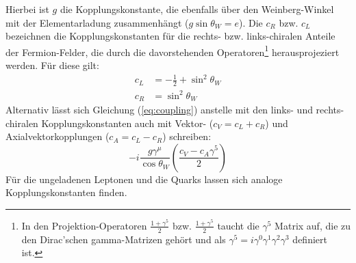 Hierbei ist $g$ die Kopplungskonstante, die ebenfalls über den Weinberg-Winkel
mit der Elementarladung zusammenhängt ($g\sin\theta_W=e$). Die $c_R$ bzw.
$c_L$ bezeichnen die Kopplungskonstanten für die rechts- bzw. links-chiralen
Anteile der Fermion-Felder, die durch die davorstehenden Operatoren\footnote{In
den Projektion-Operatoren $\frac{1+\gamma^5}{2}$ bzw. $\frac{1+\gamma^5}{2}$
taucht die $\gamma^5$ Matrix auf, die zu den Dirac'schen gamma-Matrizen gehört
und als $\gamma^5=i\gamma^0\gamma^1\gamma^2\gamma^3$ definiert ist.}
herausprojeziert werden. Für diese gilt:
\begin{align}
    c_L &= - \frac{1}{2} + \sin^2\theta_W   \\
    c_R &= \sin^2\theta_W
\end{align}
Alternativ lässt sich Gleichung (\ref{eq:coupling}) anstelle mit den links-
und rechts-chiralen Kopplungskonstanten auch mit Vektor- ($c_V=c_L+c_R$) und
Axialvektorkopplungen ($c_A=c_L-c_R$) schreiben:
\begin{equation}
    -i \frac{g\gamma^\mu}{\cos\theta_W} \left( \frac{c_V-c_A\gamma^5}{2}\right)
\end{equation}
Für die ungeladenen Leptonen und die Quarks lassen sich analoge
Kopplungskonstanten finden.

